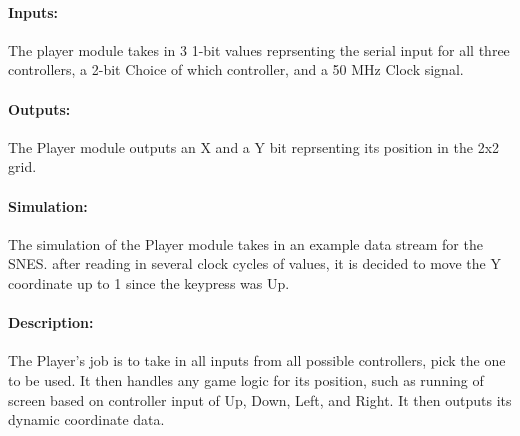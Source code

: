 \documentclass[]{article}
\begin{document}
\paragraph{Inputs:} The player module takes in 3 1-bit values reprsenting the serial input for all three controllers, a 2-bit Choice of which controller, and a 50 MHz Clock signal.
\paragraph{Outputs:} The Player module outputs an X and a Y bit reprsenting its position in the 2x2 grid.
\paragraph{Simulation:} The simulation of the Player module takes in an example data stream for the SNES. after reading in several clock cycles of values, it is decided to move the Y coordinate up to 1 since the keypress was Up.
\paragraph{Description:} The Player's job is to take in all inputs from all possible controllers, pick the one to be used. It then handles any game logic for its position, such as running of screen based on controller input of Up, Down, Left, and Right. It then outputs its dynamic coordinate data.
\end{document}
